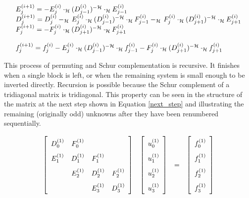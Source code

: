 \documentclass[]{elsarticle}
\begin{document}
\begin{equation} 
{\renewcommand{\arraystretch}{1.0}
\begin{array}{l}
E_{j}^{(i+1)}= - E_{j}^{(i)} \cdot_{\mathcal{H}} (D_{j-1}^{(i)})^{-\mathcal{H}} \cdot_{\mathcal{H}} E_{j-1}^{(i)}\\
D_{j}^{(i+1)}=D_{j}^{(i)} -_{\mathcal{H}} \, E_{j}^{(i)} \cdot_{\mathcal{H}} (D_{j-1}^{(i)})^{-\mathcal{H}} \cdot_{\mathcal{H}} F_{j-1}^{(i)} -_{\mathcal{H}} \, F_{j}^{(i)} \cdot_{\mathcal{H}} (D_{j+1}^{(i)})^{-\mathcal{H}} \cdot_{\mathcal{H}} E_{j+1}^{(i)}\\
F_{j}^{(i+1)}= - F_{j}^{(i)} \cdot_{\mathcal{H}} (D_{j+1}^{(i)})^{-\mathcal{H}} \cdot_{\mathcal{H}} F_{j+1}^{(i)}\\\\
f_{j}^{(i+1)}=f_{j}^{(i)} - E_{j}^{(i)} \cdot_{\mathcal{H}} (D_{j-1}^{(i)})^{-\mathcal{H}} \cdot_{\mathcal{H}} f_{j-1}^{(i)} - F_{j}^{(i)} \cdot_{\mathcal{H}} (D_{j+1}^{(i)})^{-\mathcal{H}} \cdot_{\mathcal{H}} f_{j+1}^{(i)}\\
\end{array}
}
\label{elim}
\end{equation}

This process of permuting and Schur complementation is recursive. It finishes when a single block is left, or when the remaining system is small enough to be inverted directly. Recursion is possible because the Schur complement of a tridiagonal matrix is tridiagonal. This property can be seen in the structure of the matrix at the next step shown in Equation \ref{next_step} and illustrating the remaining (originally odd) unknowns after they have been renumbered sequentially.

\begin{equation}
{\renewcommand{\arraystretch}{1.8}
\begin{array}{cccc}
\left[\begin{array}{ccccc}
D_0^{(1)} & F_0^{(1)} &     &     \\
E_1^{(1)} & D_1^{(1)} & F_1^{(1)} &     \\
    & E_2^{(1)} & D_2^{(1)} & F_2^{(1)} \\
    &     & E_3^{(1)} & D_3^{(1)} \\
\end{array}\right]
&
\left[\begin{array}{c}
u_0^{(1)}\\
u_1^{(1)}\\
u_2^{(1)}\\
u_3^{(1)}\\
\end{array}\right]
&
=
&
\left[\begin{array}{c}
f_0^{(1)}\\
f_1^{(1)}\\
f_2^{(1)}\\
f_3^{(1)}\\
\end{array}\right]
\end{array}
}
\label{next_step}
\end{equation}
\end{document}
